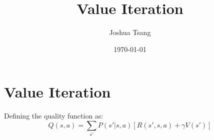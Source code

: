 \documentclass[a4paper,11pt]{article}
\title{Value Iteration}
\author{Joshua Tsang}
\date{\today}
\begin{document}
\maketitle
\tableofcontents

\section{Value Iteration}

Defining the quality function as:
\begin{equation} \label{eqn:quality_function_Q}
    Q(s,a) = \sum_{s'} P(s'|s,a) \left[ R(s',s,a) + \gamma V(s') \right]
\end{equation}
\end{document}
